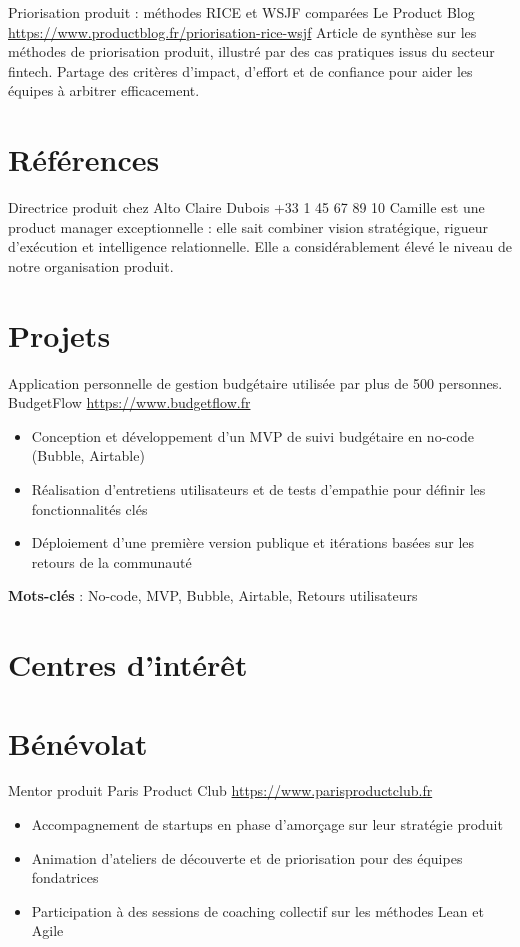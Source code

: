 \documentclass[a4paper, serif, 10pt]{moderncv}
\begin{document}
        {Priorisation produit : méthodes RICE et WSJF comparées}
        {Le Product Blog}
        {\url{https://www.productblog.fr/priorisation-rice-wsjf}}
        {}
        {Article de synthèse sur les méthodes de priorisation produit, illustré par des cas pratiques issus du secteur fintech. Partage des critères d'impact, d'effort et de confiance pour aider les équipes à arbitrer efficacement.}
\section{Références}

        {Directrice produit chez Alto}
        {Claire Dubois}
        {+33 1 45 67 89 10}
        {}
        {Camille est une product manager exceptionnelle : elle sait combiner vision stratégique, rigueur d'exécution et intelligence relationnelle. Elle a considérablement élevé le niveau de notre organisation produit.}
\section{Projets}

        {Application personnelle de gestion budgétaire utilisée par plus de 500 personnes.}
        {BudgetFlow}
        {\url{https://www.budgetflow.fr}}
        {}
        {\begin{itemize}
\item Conception et développement d'un MVP de suivi budgétaire en no-code (Bubble, Airtable)
\item Réalisation d'entretiens utilisateurs et de tests d'empathie pour définir les fonctionnalités clés
\item Déploiement d'une première version publique et itérations basées sur les retours de la communauté
\end{itemize}
\textbf{Mots-clés} : No-code, MVP, Bubble, Airtable, Retours utilisateurs}
\section{Centres d'intérêt}

\section{Bénévolat}

        {Mentor produit}
        {Paris Product Club}
        {\url{https://www.parisproductclub.fr}}
        {}
        {\begin{itemize}
\item Accompagnement de startups en phase d'amorçage sur leur stratégie produit
\item Animation d'ateliers de découverte et de priorisation pour des équipes fondatrices
\item Participation à des sessions de coaching collectif sur les méthodes Lean et Agile
\end{itemize}}
    
\end{document}
